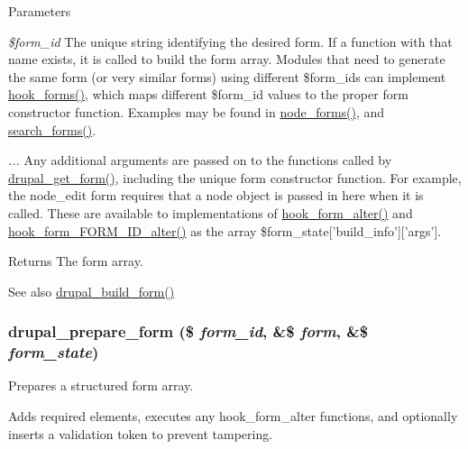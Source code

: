 \begin{DoxyParams}{Parameters}
\item[{\em \$form\_\-id}]The unique string identifying the desired form. If a function with that name exists, it is called to build the form array. Modules that need to generate the same form (or very similar forms) using different \$form\_\-ids can implement \hyperlink{group__hooks_gaa764fee74b85797f75c0c923cad628d5}{hook\_\-forms()}, which maps different \$form\_\-id values to the proper form constructor function. Examples may be found in \hyperlink{node_8module_aeb7774b7406a9dcba3c7f587a520df31}{node\_\-forms()}, and \hyperlink{search_8module_a3396c4111908648bd2d0ddff911449fa}{search\_\-forms()}. \item[{\em ...}]Any additional arguments are passed on to the functions called by \hyperlink{group__form__api_ga720df81a837b06dfe19daf1c1eea3437}{drupal\_\-get\_\-form()}, including the unique form constructor function. For example, the node\_\-edit form requires that a node object is passed in here when it is called. These are available to implementations of \hyperlink{group__hooks_ga6df3cea27ae1407aeef4eae5444cb213}{hook\_\-form\_\-alter()} and \hyperlink{group__hooks_ga8d4a4089551493d55911bd5c4f218264}{hook\_\-form\_\-FORM\_\-ID\_\-alter()} as the array \$form\_\-state\mbox{[}'build\_\-info'\mbox{]}\mbox{[}'args'\mbox{]}.\end{DoxyParams}
\begin{DoxyReturn}{Returns}
The form array.
\end{DoxyReturn}
\begin{DoxySeeAlso}{See also}
\hyperlink{group__form__api_gabead4b3c089fd605421d371a0315c4d7}{drupal\_\-build\_\-form()} 
\end{DoxySeeAlso}
\hypertarget{group__form__api_ga79309515217249c16c7e4a7117141120}{
\subsubsection[{drupal\_\-prepare\_\-form}]{\setlength{\rightskip}{0pt plus 5cm}drupal\_\-prepare\_\-form (\$ {\em form\_\-id}, \/  \&\$ {\em form}, \/  \&\$ {\em form\_\-state})}}
\label{group__form__api_ga79309515217249c16c7e4a7117141120}
Prepares a structured form array.

Adds required elements, executes any hook\_\-form\_\-alter functions, and optionally inserts a validation token to prevent tampering.


